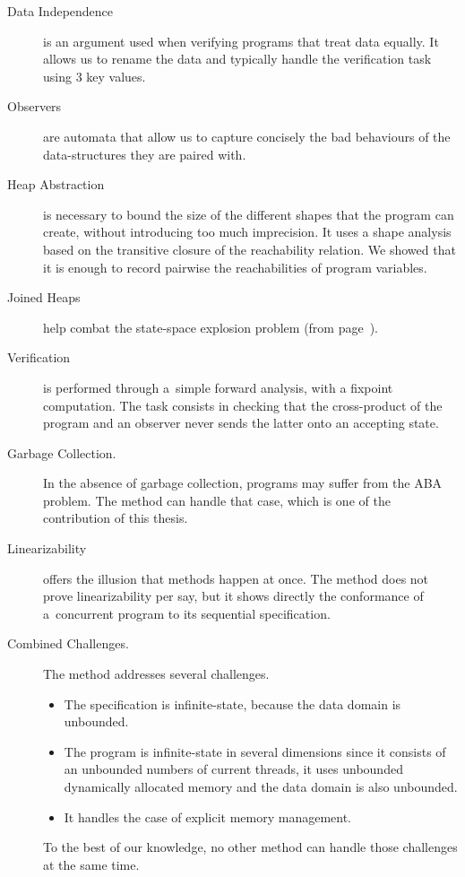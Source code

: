 \begin{description}
\item[Data Independence] is an argument used when verifying programs
  that treat data equally. It allows us to rename the data and
  typically handle the verification task using 3 key values.
\item[Observers] are automata that allow us to capture concisely the
  bad behaviours of the data-structures they are paired with.
\item[Heap Abstraction] is necessary to bound the size of the
  different shapes that the program can create, without introducing
  too much imprecision. It uses a shape analysis based on the
  transitive closure of the reachability relation. We showed that it
  is enough to record pairwise the reachabilities of program
  variables.
\item[Joined Heaps] help combat the state-space explosion
  problem %
  (from page~\pageref{combat:state:space:explosion}).
\item[Verification] is performed through a~simple forward analysis,
  with a fixpoint computation. The task consists in checking that the
  cross-product of the program and an observer never sends the latter
  onto an accepting state.
\item[Garbage Collection.] In the absence of garbage collection,
  programs may suffer from the ABA problem. The method can handle that
  case, which is one of the contribution of this thesis.
\item[Linearizability] offers the illusion that methods happen at
  once. The method does not prove linearizability per say, but it shows
  directly the conformance of a~concurrent program to its sequential
  specification.
\item[Combined Challenges.] The method addresses several challenges.
  \begin{itemize}[leftmargin=0pt]
  \item The specification is infinite-state, because the data domain
    is unbounded.
  \item The program is infinite-state in several dimensions since it
    consists of an unbounded numbers of current threads, it uses
    unbounded dynamically allocated memory and the data domain is also
    unbounded.
  \item It handles the case of explicit memory management.
  \end{itemize}
  To the best of our knowledge, no other method can handle those
  challenges at the same time.
\end{description}
